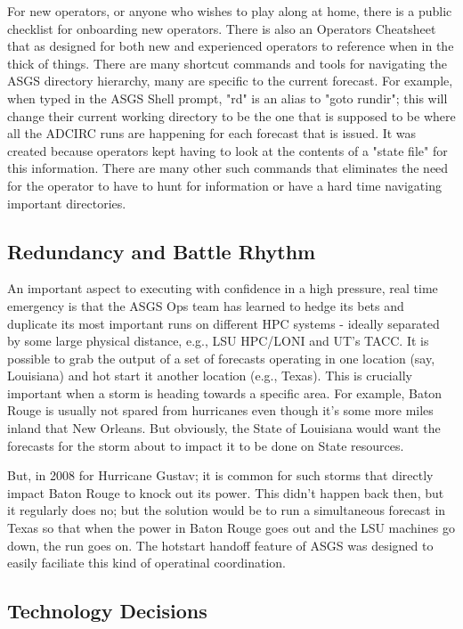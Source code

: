 \documentclass{article}
\begin{document}
For new operators, or anyone who wishes to play along at home, there is a public
checklist for onboarding new operators. There is also an Operators
Cheatsheet\cite{} that as designed for both new and experienced operators to
reference when in the thick of things. There are many shortcut commands and
tools for navigating the ASGS directory hierarchy, many are specific to the
current forecast. For example, when typed in the ASGS Shell prompt, "rd" is an
alias to "goto rundir"; this will change their current working directory to be
the one that is supposed to be where all the ADCIRC runs are happening for each
forecast that is issued. It was created because operators kept having to look at
the contents of a "state file" for this information. There are many other such
commands that eliminates the need for the operator to have to hunt for
information or have a hard time navigating important directories.

\subsection{Redundancy and Battle Rhythm}

An important aspect to executing with confidence in a high pressure, real time
emergency is that the ASGS Ops team has learned to hedge its bets and duplicate
its most important runs on different HPC systems - ideally separated by some
large physical distance, e.g., LSU HPC/LONI and UT's TACC. It is possible to
grab the output of a set of forecasts operating in one location (say, Louisiana)
and hot start it another location (e.g., Texas). This is crucially important
when a storm is heading towards a specific area. For example, Baton Rouge is
usually not spared from hurricanes even though it's some more miles inland that
New Orleans. But obviously, the State of Louisiana would want the forecasts for
the storm about to impact it to be done on State resources.

But, in 2008 for Hurricane Gustav; it is common for such storms that directly
impact Baton Rouge to knock out its power. This didn't happen back then, but it
regularly does no; but the solution would be to run a simultaneous forecast in
Texas so that when the power in Baton Rouge goes out and the LSU machines go
down, the run goes on. The hotstart handoff feature of ASGS was designed to
easily faciliate this kind of operatinal coordination.

\subsection{Technology Decisions}
\end{document}
